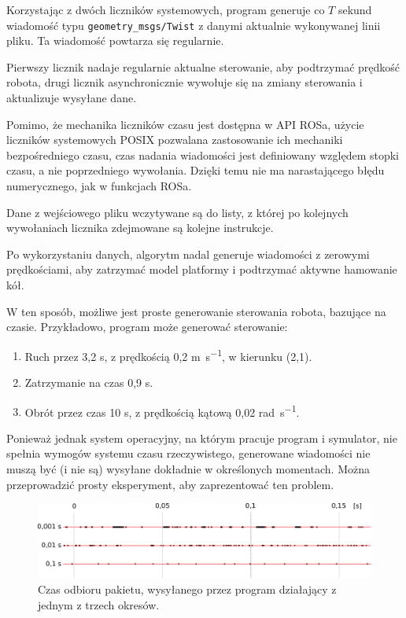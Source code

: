	Korzystając z dwóch liczników systemowych, program generuje co $T$ sekund wiadomość typu \texttt{geometry\_msgs/Twist} z danymi aktualnie wykonywanej linii pliku.
	Ta wiadomość powtarza się regularnie.
	
	Pierwszy licznik nadaje regularnie aktualne sterowanie, aby podtrzymać prędkość robota, drugi licznik asynchronicznie wywołuje się na zmiany sterowania i aktualizuje wysyłane dane.
	
	Pomimo, że mechanika liczników czasu jest dostępna w API ROSa, użycie liczników systemowych POSIX pozwalana zastosowanie ich mechaniki bezpośredniego czasu,
	czas nadania wiadomości jest definiowany względem stopki czasu, a nie poprzedniego wywołania.
	Dzięki temu nie ma narastającego błędu numerycznego, jak w funkcjach ROSa. 
	
	Dane z wejściowego pliku wczytywane są do listy, z której po kolejnych wywołaniach licznika zdejmowane są kolejne instrukcje.
	
	Po wykorzystaniu danych, algorytm nadal generuje wiadomości z zerowymi prędkościami, aby zatrzymać model platformy i podtrzymać aktywne hamowanie kół.
	
	W ten sposób, możliwe jest proste generowanie sterowania robota, bazujące na czasie.
	Przykładowo, program może generować sterowanie:
	\begin{enumerate}
		\item Ruch przez 3,2 \si{\second}, z prędkością 0,2 \si{\metre\per\second}, w kierunku (2,1).
		\item Zatrzymanie na czas 0,9 \si{\second}.
		\item Obrót przez czas 10 \si{\second}, z prędkością kątową 0,02 \si{\radian\per\second}.
	\end{enumerate}
	
	Ponieważ jednak system operacyjny, na którym pracuje program i symulator, nie spełnia wymogów systemu czasu rzeczywistego, generowane wiadomości
	nie muszą być (i nie są) wysyłane dokładnie w określonych momentach. Można przeprowadzić prosty eksperyment, aby zaprezentować ten problem.
	
	\begin{figure}[H]
	\centering
	\includegraphics[width=\textwidth]{graphics/gramofon.pdf}
	\caption{Czas odbioru pakietu, wysyłanego przez program działający z jednym z trzech okresów.}
	\end{figure}
	

